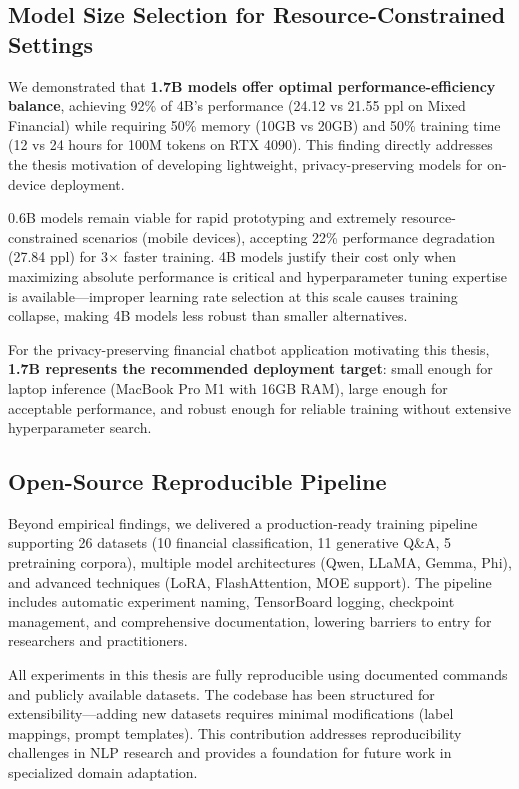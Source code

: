 \subsection{Model Size Selection for Resource-Constrained Settings}

We demonstrated that \textbf{1.7B models offer optimal performance-efficiency balance}, achieving 92\% of 4B's performance (24.12 vs 21.55 ppl on Mixed Financial) while requiring 50\% memory (10GB vs 20GB) and 50\% training time (12 vs 24 hours for 100M tokens on RTX 4090). This finding directly addresses the thesis motivation of developing lightweight, privacy-preserving models for on-device deployment.

0.6B models remain viable for rapid prototyping and extremely resource-constrained scenarios (mobile devices), accepting 22\% performance degradation (27.84 ppl) for 3$\times$ faster training. 4B models justify their cost only when maximizing absolute performance is critical and hyperparameter tuning expertise is available—improper learning rate selection at this scale causes training collapse, making 4B models less robust than smaller alternatives.

For the privacy-preserving financial chatbot application motivating this thesis, \textbf{1.7B represents the recommended deployment target}: small enough for laptop inference (MacBook Pro M1 with 16GB RAM), large enough for acceptable performance, and robust enough for reliable training without extensive hyperparameter search.

\subsection{Open-Source Reproducible Pipeline}

Beyond empirical findings, we delivered a production-ready training pipeline supporting 26 datasets (10 financial classification, 11 generative Q\&A, 5 pretraining corpora), multiple model architectures (Qwen, LLaMA, Gemma, Phi), and advanced techniques (LoRA, FlashAttention, MOE support). The pipeline includes automatic experiment naming, TensorBoard logging, checkpoint management, and comprehensive documentation, lowering barriers to entry for researchers and practitioners.

All experiments in this thesis are fully reproducible using documented commands and publicly available datasets. The codebase has been structured for extensibility—adding new datasets requires minimal modifications (label mappings, prompt templates). This contribution addresses reproducibility challenges in NLP research and provides a foundation for future work in specialized domain adaptation.

